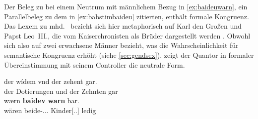 

\label{phsec:baideuwarn}
Der Beleg zu  bei einem Neutrum mit männlichem Bezug in
\cref{ex:baideuwarn}, ein Parallelbeleg zu dem in \cref{ex:babstimbaideu}
zitierten, enthält formale Kongruenz. Das Lexem   zu
mhd.\  
\autocites[\pno~]{mwb1}[vgl.~auch][53]{kroonen2013} bezieht sich hier
metaphorisch auf Karl den Großen und Papst Leo~III., die vom Kaiserchronisten
als Brüder dargestellt werden
\autocites[14370]{schroeder1895}[vgl.][83]{weis2022}. Obwohl sich 
also auf zwei erwachsene Männer bezieht, was die Wahrscheinlichkeit für
semantische Kongruenz erhöht (siehe \cref{sec:gendsex}), zeigt der Quantor in
formaler Übereinstimmung mit seinem Controller die neutrale Form.

\begin{exe}
\ex \label{ex:baideuwarn}
	\gll der wídem vnd der zehent gar. \\
		der Dotierungen und der Zehnten gar \\
\sn \gll wærn \textbf{baidev} \textbf{warn} bar. \\ %
		wären beide-\Nom.\Pl.\NeutM.\St{} Kinder[\Nom.\Pl.\NeutM] ledig \\
	\begin{taggedline}{\parencites[\pno~75\rb, 3--4]{kc:C1}[vgl. abweichend][\pno~85\vb, 24]{kc:K}[][14384--14385]{schroeder1895}}
	\trans {}
	\end{taggedline}
\end{exe}


